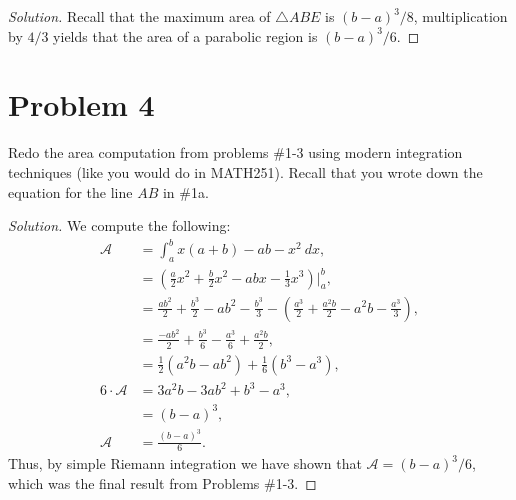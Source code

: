 \documentclass[letterpaper, 12pt]{amsart}
\theoremstyle{definition}  %
\begin{document}
		\begin{proof}[Solution]
		Recall that the maximum area of $\triangle ABE$ is $(b-a)^{3}/8$, multiplication by $4/3$ yields that the area of a parabolic region is $(b-a)^{3}/6$.
		\end{proof}

	\section*{Problem 4}
	Redo the area computation from problems \#1-3 using modern integration techniques (like you would do in MATH251). 
	Recall that you wrote down the equation for the line $AB$ in \#1a.

	\begin{proof}[Solution]
	We compute the following:
		\begin{align*}
			\mathcal{A} &= \int_{a}^{b} x(a+b) - ab - x^{2} \ dx, \\
			&= \left( \frac{a}{2}x^{2} + \frac{b}{2}x^{2} - abx - \frac{1}{3}x^{3} \right)\Big|_{a}^{b}, \\
			&= \frac{ab^{2}}{2} + \frac{b^{3}}{2} - ab^{2} - \frac{b^{3}}{3} - \left( \frac{a^{3}}{2} + \frac{a^{2}b}{2} - a^{2}b - \frac{a^{3}}{3} \right), \\
			&= \frac{-ab^{2}}{2} + \frac{b^{3}}{6} - \frac{a^{3}}{6} + \frac{a^{2}b}{2}, \\
			&= \frac{1}{2} \left( a^{2}b - ab^{2} \right) + \frac{1}{6} \left( b^{3} - a^{3} \right), \\
			6 \cdot \mathcal{A} &= 3a^{2}b - 3ab^{2} + b^{3} - a^{3}, \\
			&= (b - a)^{3}, \\
			\mathcal{A} &= \frac{(b - a)^{3}}{6}.
		\end{align*}
	Thus, by simple Riemann integration we have shown that $\mathcal{A} = (b-a)^{3}/6$, which was the final result from Problems \#1-3.
	\end{proof}
\end{document}
